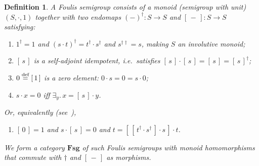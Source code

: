 \documentclass{article}
\newtheorem{definition}[theorem]{Definition}
\newcommand{\Cat}[1]{\ensuremath{\mathbf{#1}}}
\newcommand{\ex}[2]{\exists_{#1}.\,#2}
\newcommand{\sai}[1]{[\,#1\,]}
\begin{document}
\begin{definition}
\label{FoulisDef}
A Foulis semigroup consists of a monoid (semigroup with unit) $(S,
\cdot, 1)$ together with two endomaps $(-)^{\dag} \colon S\rightarrow S$
and $\sai{-} \colon S\rightarrow S$ satisfying:
\begin{enumerate}
\item $1^{\dag} = 1$ and $(s\cdot t)^{\dag} = t^{\dag}\cdot s^{\dag}$
  and $s^{\dag\dag} = s$, making $S$ an involutive monoid;

\item $\sai{s}$ is a self-adjoint idempotent, \textit{i.e.}~satisfies
  $\sai{s} \cdot \sai{s} = \sai{s} = \sai{s}^{\dag}$;

\item $0 \;\smash{\stackrel{\textrm{def}}{=}}\; \sai{1}$ is a zero
element: $0 \cdot s = 0 = s\cdot 0$;

\item $s\cdot x = 0$ iff $\ex{y}{x = \sai{s}\cdot y}$.

\end{enumerate}

\noindent Or, equivalently (see~\cite[Chapter~5, \S\S18,
Lemma~1]{Kalmbach83}),
\begin{enumerate}
\item[4$'\!$.] $\sai{0} = 1$ and $s \cdot \sai{s} = 0$ and 
$t = \sai{\sai{t^{\dag} \cdot s^{\dag}}\cdot s}\cdot t$.
\end{enumerate}

We form a category \Cat{Fsg} of such Foulis semigroups with monoid
homomorphisms that commute with $\dag$ and $\sai{-}$ as morphisms.
\end{definition}
\end{document}
